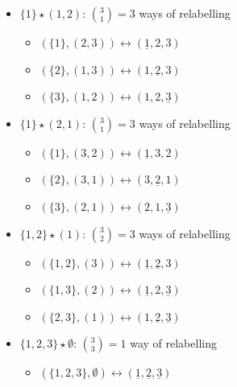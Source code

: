 \begin{itemize}
    \item $\{1\} \star (1,2)$: $\binom{3}{1} = 3$ ways of relabelling
        \begin{itemize}
            \item $(\{1\}, (2,3)) \leftrightarrow (\underline{1},2,3)$
            \item $(\{2\}, (1,3)) \leftrightarrow (1,\underline{2},3)$
            \item $(\{3\}, (1,2)) \leftrightarrow (1,2,\underline{3})$
        \end{itemize}
    \item $\{1\} \star (2,1)$: $\binom{3}{1} = 3$ ways of relabelling
        \begin{itemize}
            \item $(\{1\}, (3,2)) \leftrightarrow (\underline{1},3,2)$
            \item $(\{2\}, (3,1)) \leftrightarrow (3,\underline{2},1)$
            \item $(\{3\}, (2,1)) \leftrightarrow (2,1,\underline{3})$
        \end{itemize}
\end{itemize}

\begin{itemize}
    \item $\{1,2\} \star (1)$: $\binom{3}{2} = 3$ ways of relabelling
        \begin{itemize}
            \item $(\{1,2\}, (3)) \leftrightarrow (\underline{1},\underline{2},3)$
            \item $(\{1,3\}, (2)) \leftrightarrow (\underline{1},2,\underline{3})$
            \item $(\{2,3\}, (1)) \leftrightarrow (1,\underline{2},\underline{3})$
        \end{itemize}
\end{itemize}

\begin{itemize}
    \item $\{1,2,3\} \star \emptyset$: $\binom{3}{3} = 1$ way of relabelling
        \begin{itemize}
            \item $(\{1,2,3\}, \emptyset) \leftrightarrow (\underline{1},\underline{2},\underline{3})$
        \end{itemize}
\end{itemize}

